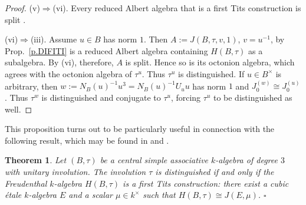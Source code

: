 \documentclass{amsart}
\newtheorem{thm}[equation]{Theorem}
\theoremstyle{definition} %
\theoremstyle{remark} %
\renewcommand{\:}{\colon\,}
\numberwithin{equation}{section}
\begin{document}
\begin{proof}
(v)$\Rightarrow$(vi). Every reduced Albert algebra that is a first Tits construction is split \cite[Cor.~4.2]{MR734841}.

(vi)$\Rightarrow$(iii). Assume $u \in B$ has norm $1$. Then $A := J(B,\tau,v,1)$, $v = u^{-1}$, by Prop.~\ref{p.DIFITI} is a reduced Albert algebra containing $H(B,\tau)$ as a subalgebra. By (vi), therefore, $A$ is split. Hence so is its octonion algebra, which agrees with the octonion algebra of $\tau^u$. Thus $\tau^u$ is distinguished. If $u \in B^\times$ is arbitrary, then $w := N_B(u)^{-1}u^3 = N_B(u)^{-1}U_uu$ has norm $1$ and $J_0^{(w)} \cong J_0^{(u)}$. Thus $\tau^w$ is distinguished and conjugate to $\tau^u$, forcing $\tau^u$ to be distinguished as well.  
\end{proof}
This proposition turns out to be particularly useful in connection with the following result, which may be found in \cite[Thm.~(19.14)]{MR1632779} and \cite[Thm.~3.1]{MR2063796}.

\begin{thm} \label{t.CHADIS}
Let $(B,\tau)$ be a central simple associative $k$-algebra of degree $3$ with unitary involution. The involution $\tau$ is distinguished if and only if  the Freudenthal $k$-algebra $H(B,\tau)$ is a first Tits construction: there exist a cubic \'etale $k$-algebra $E$ and a scalar $\mu \in k^\times$ such that $H(B,\tau) \cong J(E,\mu)$. \hfill $\square$	
\end{thm}
\end{document}
